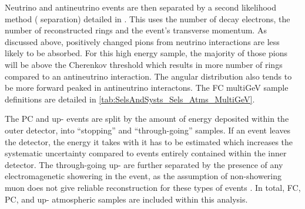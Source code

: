 Neutrino and antineutrino events are then separated by a second likelihood method (\quickmath{\nu/\bar{\nu}} separation) detailed in \cite{Kamiokande_Collaboration2017-nf}. This uses the number of decay electrons, the number of reconstructed rings and the event's transverse momentum. As discussed above, positively changed pions from neutrino interactions are less likely to be absorbed. For this high energy sample, the majority of those pions will be above the Cherenkov threshold which results in more number of rings compared to an antineutrino interaction. The angular distribution also tends to be more forward peaked in antineutrino interactons. The FC multiGeV sample definitions are detailed in \autoref{tab:SelsAndSysts_Sels_Atms_MultiGeV}.

The PC and up-\quickmath{\mu} events are split by the amount of energy deposited within the outer detector, into ``stopping'' and ``through-going'' samples. If an event leaves the detector, the energy it takes with it has to be estimated which increases the systematic uncertainty compared to events entirely contained within the inner detector. The through-going up-\quickmath{\mu} are further separated by the presence of any electromagenetic showering in the event, as the assumption of non-showering muon does not give reliable reconstruction for these types of events \cite{Ashie_2005}. In total,  FC,  PC, and  up-\quickmath{\mu} atmospheric samples are included within this analysis.


